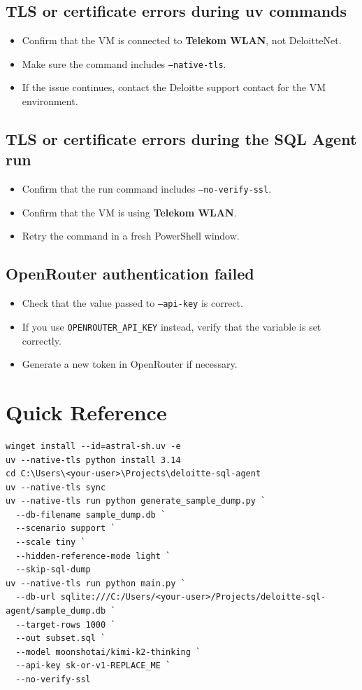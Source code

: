 \documentclass[11pt,a4paper]{article}
\begin{document}
\subsection*{TLS or certificate errors during uv commands}

\begin{itemize}[leftmargin=1.5em]
    \item Confirm that the VM is connected to \textbf{Telekom WLAN}, not DeloitteNet.
    \item Make sure the command includes \texttt{--native-tls}.
    \item If the issue continues, contact the Deloitte support contact for the VM environment.
\end{itemize}

\subsection*{TLS or certificate errors during the SQL Agent run}

\begin{itemize}[leftmargin=1.5em]
    \item Confirm that the run command includes \texttt{--no-verify-ssl}.
    \item Confirm that the VM is using \textbf{Telekom WLAN}.
    \item Retry the command in a fresh PowerShell window.
\end{itemize}

\subsection*{OpenRouter authentication failed}

\begin{itemize}[leftmargin=1.5em]
    \item Check that the value passed to \texttt{--api-key} is correct.
    \item If you use \texttt{OPENROUTER\_API\_KEY} instead, verify that the variable is set correctly.
    \item Generate a new token in OpenRouter if necessary.
\end{itemize}

\section{Quick Reference}

\begin{lstlisting}
winget install --id=astral-sh.uv -e
uv --native-tls python install 3.14
cd C:\Users\<your-user>\Projects\deloitte-sql-agent
uv --native-tls sync
uv --native-tls run python generate_sample_dump.py `
  --db-filename sample_dump.db `
  --scenario support `
  --scale tiny `
  --hidden-reference-mode light `
  --skip-sql-dump
uv --native-tls run python main.py `
  --db-url sqlite:///C:/Users/<your-user>/Projects/deloitte-sql-agent/sample_dump.db `
  --target-rows 1000 `
  --out subset.sql `
  --model moonshotai/kimi-k2-thinking `
  --api-key sk-or-v1-REPLACE_ME `
  --no-verify-ssl
\end{lstlisting}
\end{document}
